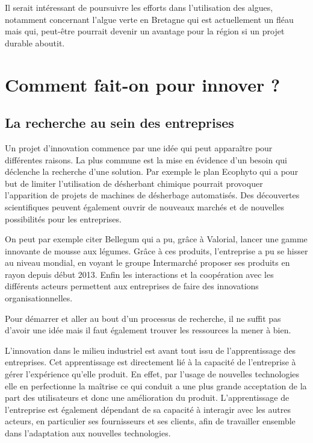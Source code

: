 \documentclass[a4paper,12pt]{report}
\begin{document}
			Il serait intéressant de poursuivre les efforts dans l’utilisation des algues, notamment concernant l’algue verte en Bretagne qui est actuellement un fléau mais qui, peut-être pourrait devenir un avantage pour la région si un projet durable aboutit. 
			
	\section{Comment fait-on pour innover ?}
			
		\subsection{La recherche au sein des entreprises}
			Un projet d’innovation commence par une idée qui peut apparaître pour différentes raisons. La plus commune est la mise en évidence d’un besoin qui déclenche la recherche d’une solution. Par exemple le plan Ecophyto\cite{RobotsChamps} qui a pour but de limiter l’utilisation de désherbant chimique pourrait provoquer l’apparition de projets de machines de désherbage automatisés. 
			Des découvertes scientifiques peuvent également ouvrir de nouveaux marchés et de nouvelles possibilités pour les entreprises. 
			
			On peut par exemple citer Bellegum\cite{Bellegum} qui a pu, grâce à Valorial, lancer une gamme innovante de mousse aux légumes. Grâce à ces produits, l’entreprise a pu se hisser au niveau mondial, en voyant le groupe Intermarché proposer ses produits en rayon depuis début 2013.
			Enfin les interactions et la coopération avec les différents acteurs permettent aux entreprises de faire des innovations organisationnelles.
			
			Pour démarrer et aller au bout d’un processus de recherche, il ne suffit pas d’avoir une idée mais il faut également trouver les ressources la mener à bien.
			
			L’innovation dans le milieu industriel est avant tout issu de l’apprentissage des entreprises. Cet apprentissage est directement lié à la capacité de l’entreprise à gérer l’expérience qu’elle produit. En effet, par l’usage de nouvelles technologies elle en perfectionne la maîtrise ce qui conduit a une plus grande acceptation de la part des utilisateurs et donc une amélioration du produit. 
			L’apprentissage de l’entreprise est également dépendant de sa capacité à interagir avec les autres acteurs, en particulier ses fournisseurs et ses clients, afin de travailler ensemble dans l’adaptation aux nouvelles technologies.
			
\end{document}
